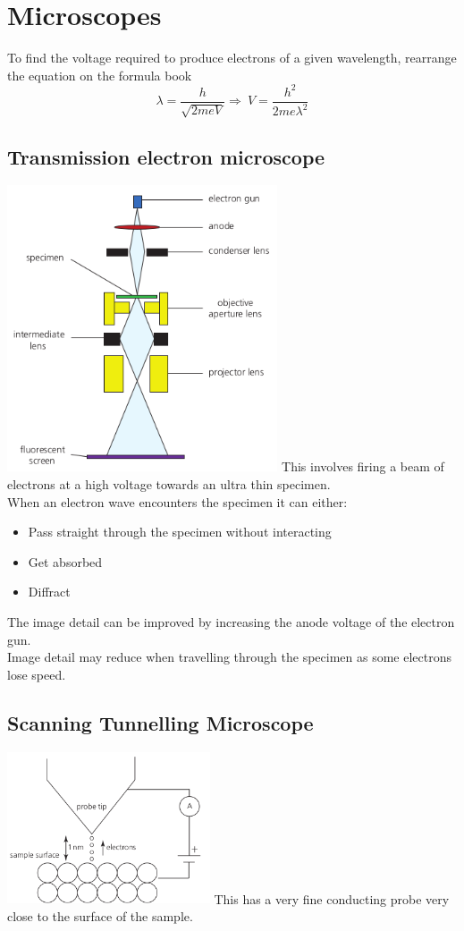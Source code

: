 \documentclass[12pt]{article}
\begin{document}
\section{Microscopes}
To find the voltage required to produce electrons of a given wavelength, rearrange the equation on the formula book
$$\lambda=\frac{h}{\sqrt{2meV}}\Rightarrow \ V=\frac{h^2}{2me\lambda^2}$$
\subsection{Transmission electron microscope}
\includegraphics[width=8cm]{tem.png}
This involves firing a beam of electrons at a high voltage towards an ultra thin specimen.\\
When an electron wave encounters the specimen it can either:
\begin{itemize}
\item Pass straight through the specimen without interacting
\item Get absorbed
\item Diffract
\end{itemize}
The image detail can be improved by increasing the anode voltage of the electron gun.\\
Image detail may reduce when travelling through the specimen as some electrons lose speed.
\subsection{Scanning Tunnelling Microscope}
\includegraphics[width=6cm]{stm.png}
This has a very fine conducting probe very close to the surface of the sample. 
\end{document}
